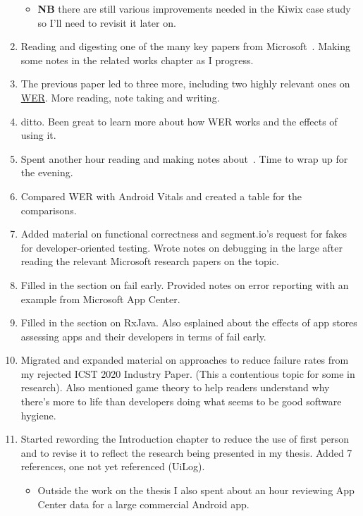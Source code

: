 \begin{enumerate}
\begin{itemize}
        \item \textbf{NB} there are still various improvements needed in the Kiwix case study so I'll need to revisit it later on.
    \end{itemize}
    \item Reading and digesting one of the many key papers from Microsoft~\citep{buse2012_information_needs_for_software_development_analytics}. Making some notes in the related works chapter as I progress.
    \item The previous paper led to three more, including two highly relevant ones on \href{glossary-wer}{WER}. More reading, note taking and writing.
    \item ditto. Been great to learn more about how WER works and the effects of using it.
    \item Spent another hour reading and making notes about~\citep{kinshuman2009_debugging_in_the_very_large}. Time to wrap up for the evening.
    \item Compared WER with Android Vitals and created a table for the comparisons.
    \item Added material on functional correctness and segment.io's request for fakes for developer-oriented testing. Wrote notes on debugging in the large after reading the relevant Microsoft research papers on the topic.
    \item Filled in the section on fail early. Provided notes on error reporting with an example from Microsoft App Center.
    \item Filled in the section on RxJava. Also esplained about the effects of app stores assessing apps and their developers in terms of fail early.
    \item Migrated and expanded material on approaches to reduce failure rates from my rejected ICST 2020 Industry Paper. (This a contentious topic for some in research). Also mentioned game theory to help readers understand why there's more to life than developers doing what seems to be good software hygiene. 
    \item Started rewording the Introduction chapter to reduce the use of first person and to revise it to reflect the research being presented in my thesis. Added 7 references, one not yet referenced (UiLog).
    \begin{itemize}
        \item Outside the work on the thesis I also spent about an hour reviewing App Center data for a large commercial Android app.
    \end{itemize}

\end{enumerate}
